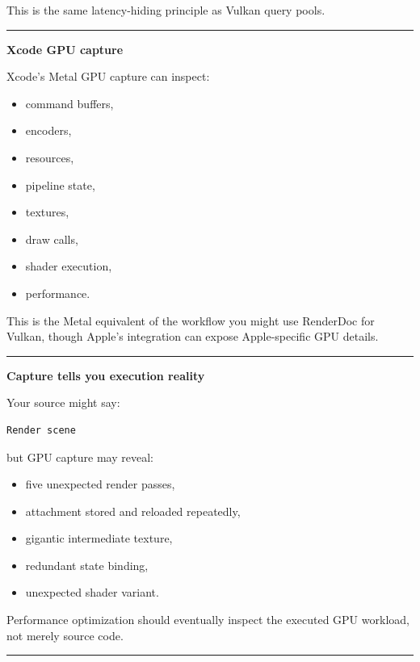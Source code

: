 This is the same latency-hiding principle as Vulkan query pools.

\begin{center}\rule{0.5\linewidth}{0.5pt}\end{center}

\textbf{Xcode GPU capture}

Xcode's Metal GPU capture can inspect:

\begin{itemize}
\tightlist
\item
  command buffers,
\item
  encoders,
\item
  resources,
\item
  pipeline state,
\item
  textures,
\item
  draw calls,
\item
  shader execution,
\item
  performance.
\end{itemize}

This is the Metal equivalent of the workflow you might use RenderDoc for Vulkan, though Apple's integration can expose Apple-specific GPU details.

\begin{center}\rule{0.5\linewidth}{0.5pt}\end{center}

\textbf{Capture tells you execution reality}

Your source might say:

\begin{verbatim}
Render scene
\end{verbatim}

but GPU capture may reveal:

\begin{itemize}
\tightlist
\item
  five unexpected render passes,
\item
  attachment stored and reloaded repeatedly,
\item
  gigantic intermediate texture,
\item
  redundant state binding,
\item
  unexpected shader variant.
\end{itemize}

Performance optimization should eventually inspect the executed GPU workload, not merely source code.

\begin{center}\rule{0.5\linewidth}{0.5pt}\end{center}

